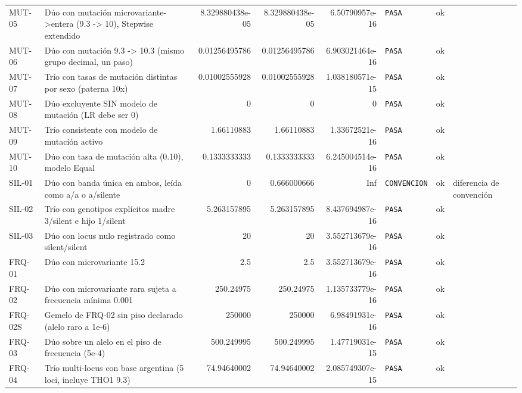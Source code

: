 \documentclass[11pt,a4paper]{article}
\begin{document}
\begin{landscape}
\begin{longtable}{@{}lp{268pt}rrrlll@{}}
MUT-05 & Dúo con mutación microvariante->entera (9.3 -> 10), Stepwise extendido & 8.329880438e-05 & 8.329880438e-05 & 6.50790957e-16 & \textcolor{pasa}{\texttt{PASA}} & ok &  \\
MUT-06 & Dúo con mutación 9.3 -> 10.3 (mismo grupo decimal, un paso) & 0.01256495786 & 0.01256495786 & 6.903021464e-16 & \textcolor{pasa}{\texttt{PASA}} & ok &  \\
MUT-07 & Trío con tasas de mutación distintas por sexo (paterna 10x) & 0.01002555928 & 0.01002555928 & 1.038180571e-15 & \textcolor{pasa}{\texttt{PASA}} & ok &  \\
MUT-08 & Dúo excluyente SIN modelo de mutación (LR debe ser 0) & 0 & 0 & 0 & \textcolor{pasa}{\texttt{PASA}} & ok &  \\
MUT-09 & Trío consistente con modelo de mutación activo & 1.66110883 & 1.66110883 & 1.33672521e-16 & \textcolor{pasa}{\texttt{PASA}} & ok &  \\
MUT-10 & Dúo con tasa de mutación alta (0.10), modelo Equal & 0.1333333333 & 0.1333333333 & 6.245004514e-16 & \textcolor{pasa}{\texttt{PASA}} & ok &  \\
SIL-01 & Dúo con banda única en ambos, leída como a/a o a/silente & 0 & 0.666000666 & Inf & \textcolor{revisar}{\texttt{CONVENCION}} & ok & diferencia de convención \\
SIL-02 & Trío con genotipos explícitos madre 3/silent e hijo 1/silent & 5.263157895 & 5.263157895 & 8.437694987e-16 & \textcolor{pasa}{\texttt{PASA}} & ok &  \\
SIL-03 & Dúo con locus nulo registrado como silent/silent & 20 & 20 & 3.552713679e-16 & \textcolor{pasa}{\texttt{PASA}} & ok &  \\
FRQ-01 & Dúo con microvariante 15.2 & 2.5 & 2.5 & 3.552713679e-16 & \textcolor{pasa}{\texttt{PASA}} & ok &  \\
FRQ-02 & Dúo con microvariante rara sujeta a frecuencia mínima 0.001 & 250.24975 & 250.24975 & 1.135733779e-16 & \textcolor{pasa}{\texttt{PASA}} & ok &  \\
FRQ-02S & Gemelo de FRQ-02 sin piso declarado (alelo raro a 1e-6) & 250000 & 250000 & 6.98491931e-16 & \textcolor{pasa}{\texttt{PASA}} & ok &  \\
FRQ-03 & Dúo sobre un alelo en el piso de frecuencia (5e-4) & 500.249995 & 500.249995 & 1.47719031e-15 & \textcolor{pasa}{\texttt{PASA}} & ok &  \\
FRQ-04 & Trío multi-locus con base argentina (5 loci, incluye THO1 9.3) & 74.94640002 & 74.94640002 & 2.085749307e-15 & \textcolor{pasa}{\texttt{PASA}} & ok &  \\

\end{longtable}
\end{landscape}
\end{document}
